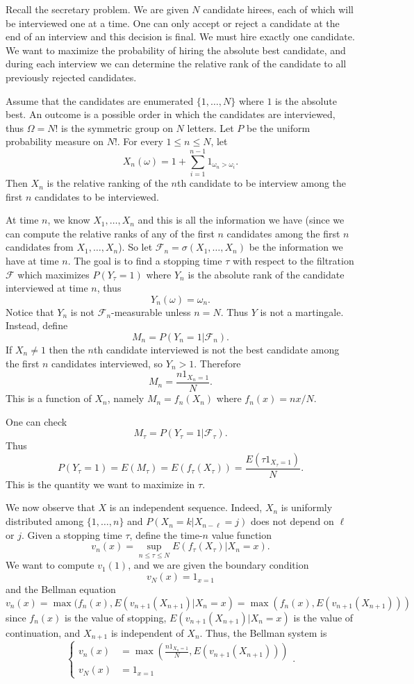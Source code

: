 \documentclass[12pt]{book}
\theoremstyle{definition}
\newenvironment{example}
  {\pushQED{\qed}\renewcommand{\qedsymbol}{$\diamondsuit$}\examplex}
  {\popQED\endexamplex}
\begin{document}
\begin{example}
Recall the secretary problem.
We are given $N$ candidate hirees, each of which will be interviewed one at a time.
One can only accept or reject a candidate at the end of an interview and this decision is final.
We must hire exactly one candidate.
We want to maximize the probability of hiring the absolute best candidate, and during each interview we can determine the relative rank of the candidate to all previously rejected candidates.

Assume that the candidates are enumerated $\{1, \dots, N\}$ where $1$ is the absolute best.
An outcome is a possible order in which the candidates are interviewed, thus $\Omega = N!$ is the symmetric group on $N$ letters.
Let $P$ be the uniform probability measure on $N!$.
For every $1 \leq n \leq N$, let
$$X_n(\omega) = 1 + \sum_{i=1}^{n-1} 1_{\omega_n > \omega_i}.$$
Then $X_n$ is the relative ranking of the $n$th candidate to be interview among the first $n$ candidates to be interviewed.

At time $n$, we know $X_1, \dots, X_n$ and this is all the information we have (since we can compute the relative ranks of any of the first $n$ candidates among the first $n$ candidates from $X_1, \dots, X_n$).
So let $\mathcal F_n = \sigma(X_1, \dots, X_n)$ be the information we have at time $n$.
The goal is to find a stopping time $\tau$ with respect to the filtration $\mathcal F$ which maximizes $P(Y_\tau = 1)$ where $Y_n$ is the absolute rank of the candidate interviewed at time $n$, thus
$$Y_n(\omega) = \omega_n.$$
Notice that $Y_n$ is not $\mathcal F_n$-measurable unless $n = N$.
Thus $Y$ is not a martingale.
Instead, define
$$M_n = P(Y_n = 1|\mathcal F_n).$$
If $X_n \neq 1$ then the $n$th candidate interviewed is not the best candidate among the first $n$ candidates interviewed, so $Y_n > 1$.
Therefore
$$M_n = \frac{n1_{X_n = 1}}{N}.$$
This is a function of $X_n$, namely $M_n = f_n(X_n)$ where $f_n(x) = nx/N$.

One can check
$$M_\tau = P(Y_\tau = 1|\mathcal F_\tau).$$
Thus
$$P(Y_\tau = 1) = E(M_\tau) = E(f_\tau(X_\tau)) = \frac{E(\tau 1_{X_\tau = 1})}{N}.$$
This is the quantity we want to maximize in $\tau$.

We now observe that $X$ is an independent sequence.
Indeed, $X_n$ is uniformly distributed among $\{1, \dots, n\}$ and $P(X_n = k|X_{n-\ell} = j)$ does not depend on $\ell$ or $j$.
Given a stopping time $\tau$, define the time-$n$ value function
$$v_n(x) = \sup_{n \leq \tau \leq N} E(f_\tau(X_\tau)|X_n = x).$$
We want to compute $v_1(1)$, and we are given the boundary condition
$$v_N(x) = 1_{x = 1}$$
and the Bellman equation
$$v_n(x) = \max(f_n(x), E(v_{n+1}(X_{n+1})|X_n = x) = \max(f_n(x), E(v_{n+1}(X_{n+1})))$$
since $f_n(x)$ is the value of stopping, $E(v_{n+1}(X_{n+1})|X_n = x)$ is the value of continuation, and $X_{n+1}$ is independent of $X_n$.
Thus, the Bellman system is
$$\begin{cases}
v_n(x) &= \max\left(\frac{n1_{X_n = 1}}{N}, E(v_{n+1}(X_{n+1}))\right)\\
v_N(x) &= 1_{x=1}
\end{cases}.$$


\end{example}
\end{document}
